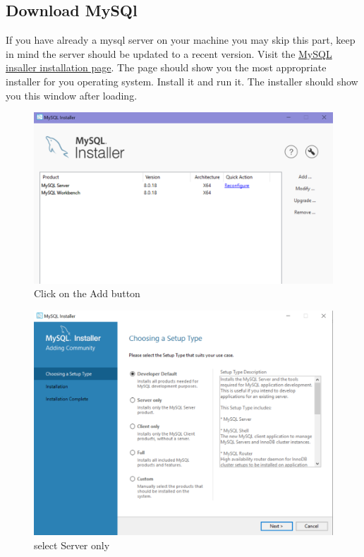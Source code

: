 \subsection{Download MySQl}
If you have already a mysql server on your machine you may skip this part, keep in mind the server should be updated to a recent version.
Visit the \href{
https://dev.mysql.com/downloads/installer/}{MySQL insaller installation page}.
The page should show you the most appropriate installer for you operating system.
Install it and run it. The installer should show you this window after loading.
\begin{figure}[h]
\centering
\includegraphics[width=\textwidth]{Images/mysqlinstaller.png}
\caption{\label{fig:myi} Click on the Add button}
\end{figure} 
\begin{figure}[h]
\centering
\includegraphics[width=\textwidth]{Images/mysql-download.png}
\caption{\label{fig:fmy} select Server only}
\end{figure} 
